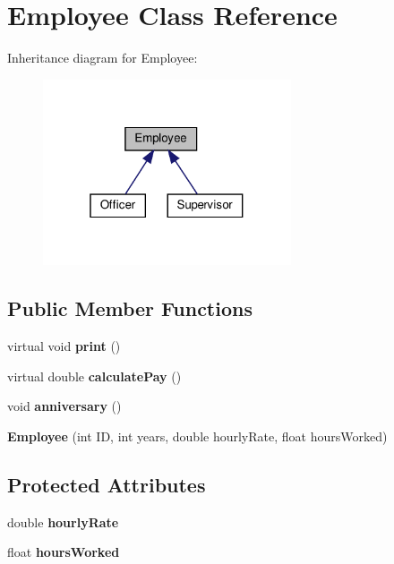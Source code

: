 \hypertarget{classEmployee}{}\section{Employee Class Reference}
\label{classEmployee}


Inheritance diagram for Employee\+:\nopagebreak
\begin{figure}[H]
\begin{center}
\leavevmode
\includegraphics[width=208pt]{classEmployee__inherit__graph}
\end{center}
\end{figure}
\subsection*{Public Member Functions}
\begin{DoxyCompactItemize}
\item 
\mbox{\label{classEmployee_a79556ad700627dba88049f487a34a762}} 
virtual void {\bfseries print} ()
\item 
\mbox{\label{classEmployee_a01c2c44e15434237db28832f6972e960}} 
virtual double {\bfseries calculate\+Pay} ()
\item 
\mbox{\label{classEmployee_a67c345031cf63f515fb09dc675dee5f3}} 
void {\bfseries anniversary} ()
\item 
\mbox{\label{classEmployee_ad0c935ef9a290a82dcf7865172c90148}} 
{\bfseries Employee} (int ID, int years, double hourly\+Rate, float hours\+Worked)
\end{DoxyCompactItemize}
\subsection*{Protected Attributes}
\begin{DoxyCompactItemize}
\item 
\mbox{\label{classEmployee_ac31134abb9b4004fc015e51ef579b069}} 
double {\bfseries hourly\+Rate}
\item 
\mbox{\label{classEmployee_afde35c73d02eb1cfe89e23a80998b42e}} 
float {\bfseries hours\+Worked}
\end{DoxyCompactItemize}
